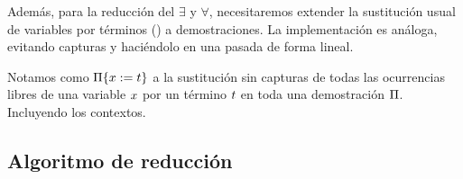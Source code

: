 Además, para la reducción del $\exists$ y $\forall$, necesitaremos extender la
sustitución usual de variables por términos () a
demostraciones. La implementación es análoga, evitando capturas y haciéndolo en
una pasada de forma lineal.
\begin{definition}
    Notamos como $\Pi \{x := t\}$ a la sustitución sin capturas de todas las ocurrencias libres de una variable $x$ por un término $t$ en toda una demostración $\Pi$. Incluyendo los contextos.
    
\end{definition}

\subsection{Algoritmo de reducción}

